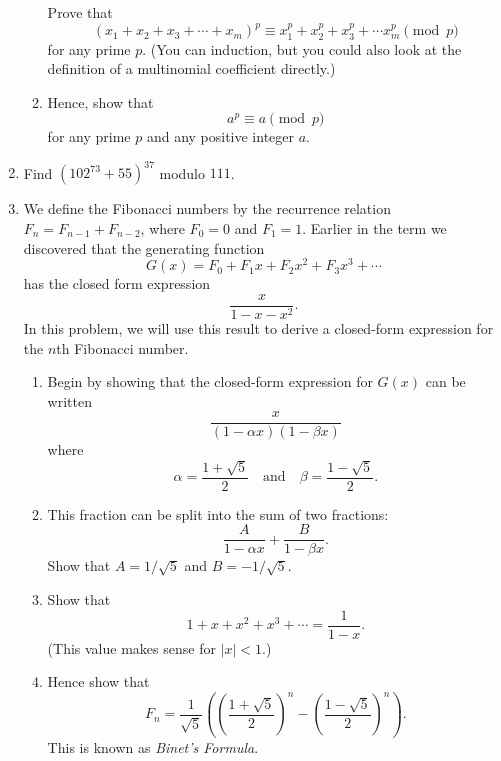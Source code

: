 \documentclass[a4paper]{article}
\begin{document}
\begin{enumerate}
\begin{enumerate}
  Prove that
  \[(x_1+x_2+x_3+\cdots+x_m)^p\equiv x_1^p+x_2^p+x_3^p+\cdots x_m^p\pmod{p}\]
    for any prime \(p\). (You can induction, but you could also look at the definition of a multinomial coefficient directly.)
  \item Hence, show that
    \[ a^p\equiv a\pmod{p}\]
    for any prime \(p\) and any positive integer \(a\).
\end{enumerate}
\item Find \((102^{73}+55)^{37}\) modulo \(111\).
\item We define the Fibonacci numbers by the recurrence relation
  \(F_n=F_{n-1}+F_{n-2}\), where \(F_0=0\) and \(F_1=1\). Earlier
  in the term we discovered that the generating function
  \[G(x)=F_0+F_1x+F_2x^2+F_3x^3+\cdots\]
  has the closed form expression
  \[\frac{x}{1-x-x^2}.\]
  In this problem, we will use this result to derive a closed-form
  expression for the \(n\)th Fibonacci number.

  \begin{enumerate}
\item  Begin by showing that the closed-form expression for \(G(x)\) can be
  written \[\frac{x}{(1-\alpha x)(1-\beta x)}\]
  where \[\alpha=\frac{1+\sqrt{5}}{2}\quad\text{and}\quad\beta=\frac{1-\sqrt{5}}{2}.\]
\item This fraction can be split into the sum of two fractions: \[\frac{A}{1-\alpha x}+\frac{B}{1-\beta x}.\]
  Show that \(A=1/\sqrt5\) and \(B=-1/\sqrt5\).
\item Show that \[1+x+x^2+x^3+\cdots=\frac{1}{1-x}.\]
  (This value makes sense for \(|x|<1\).)
\item Hence show that \[F_n=\frac{1}{\sqrt5}\left(\left(\frac{1+\sqrt5}{2}\right)^n-\left(\frac{1-\sqrt5}{2}\right)^n\right).\]
  This is known as \emph{Binet's Formula}.
\end{enumerate}
\end{enumerate}
\end{document}
